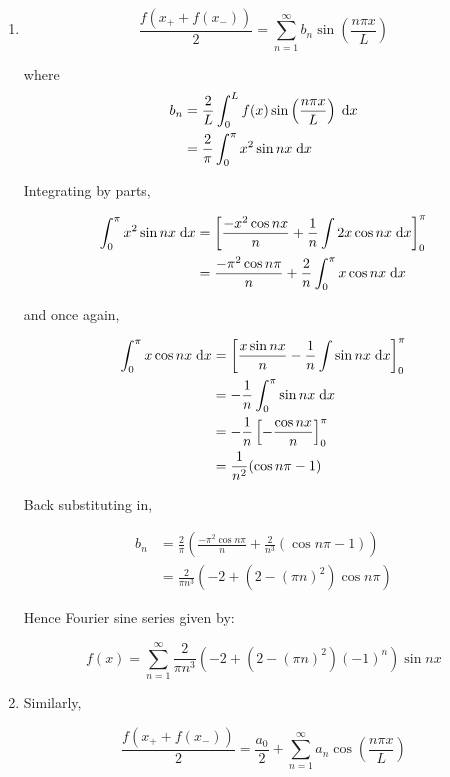 \documentclass[a4paper]{article}
\begin{document}
\begin{enumerate}[label = (\alph*)]
	\item \[ \frac{f(x_{+} + f(x_{-}))}{2} =  \sum_{n=1}^{\infty} b_{n} \sin \left( \frac{n \pi x}{L} \right)  \]
	
	where 
	\begin{align*}
	b_{n} & = \frac{2}{L} \int_{0}^{L} f(x) \sin \left( \frac{n \pi x}{L} \right) \; \mathrm{d} x  \\
	& = \frac{2}{\pi} \int_{0}^{\pi} x^{2} \sin n x \; \mathrm{d} x
	\end{align*}
	
	Integrating by parts,
	
	\begin{align*}
	\int_{0}^{\pi} x^{2} \sin n x \; \mathrm{d} x & = \left[  \frac{- x^{2} \cos n x }{n} + \frac{1}{n} \int 2x \cos n x \; \mathrm{d} x \right]_{0}^{\pi}  \\
	& = \frac{- \pi^{2} \cos n \pi}{n} + \frac{2}{n} \int_{0}^{\pi} x \cos n x \; \mathrm{d} x
	\end{align*}
	
	and once again,
	
	\begin{align*}
	\int_{0}^{\pi} x \cos n x \; \mathrm{d} x & =\left[ \frac{x \sin n x}{n} - \frac{1}{n} \int \sin n x \; \mathrm{d} x \right]_{0}^{\pi}  \\
	& = - \frac{1}{n} \int_{0}^{\pi} \sin n x \; \mathrm{d} x \\
	& = - \frac{1}{n} \left[ - \frac{\cos n x}{n} \right]_{0}^{\pi}\\
	& = \frac{1}{n^{2}} (\cos n \pi - 1) 
	\end{align*}
	
	Back substituting in, 
	
	\begin{align*}
	b_{n} & = \frac{2}{\pi} \left( \frac{- \pi^{2} \cos n \pi}{n} + \frac{2}{n^{3}} (\cos n \pi - 1)   \right)  \\
	& = \frac{2}{\pi n^{3}} \left(   - 2 + (2 - (\pi n)^{2} )\cos n \pi       \right) 
	\end{align*}
	
	Hence Fourier sine series given by:
	
	\[ f(x) = \sum_{n=1}^{\infty} \frac{2}{\pi n^{3}} \left(   - 2 + (2 - (\pi n)^{2} ) (-1)^{n} \right) \sin n x  \]
	
	\item Similarly,
	
	\[ \frac{f(x_{+} + f(x_{-}))}{2} =  \frac{a_{0}}{2} + \sum_{n=1}^{\infty} a_{n} \cos \left( \frac{n \pi x}{L} \right)  \]
	

\end{enumerate}
\end{document}
